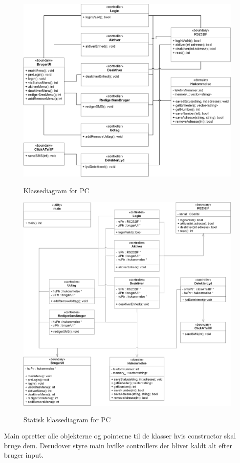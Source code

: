 \begin{figure}[!htb]
     {\includegraphics[width=\textwidth]{billeder/uml/PC_Class}}
     \caption{Klassediagram for PC}
     \label{fig:PC_Class}
\end{figure}

\clearpage
\vspace*{30 px}
\begin{figure}[!htb]
     {\includegraphics[width=\textwidth]{billeder/uml/PC_Class_static}}
     \caption{Statisk klassediagram for PC}
     \label{fig:PC_Class}
\end{figure}

Main opretter alle objekterne og pointerne til de klasser hvis constructor skal bruge dem. Derudover styre main hvilke controllers der bliver kaldt alt efter bruger input.
%
